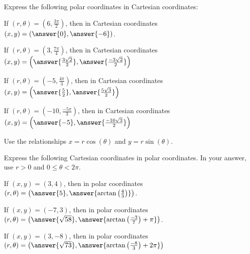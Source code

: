 \documentclass{ximera}
\author{Jason Miller}
\begin{document}
\begin{exercise}

Express the following polar coordinates in Cartesian coordinates: 

If $\left(r,\theta\right) = \left( 6, \frac{3\pi}{2}\right)$, then in Cartesian coordinates $(x,y) = \left( \answer{0}, \answer{-6 }\right)$.

If $\left(r,\theta\right) = \left(3, \frac{7 \pi}{4}\right)$, then in Cartesian coordinates $(x,y) = \left( \answer{\frac{3\sqrt{2}}{2}}, \answer{\frac{-3\sqrt{2}}{2}} \right)$

If $\left(r,\theta\right) =\left( -5, \frac{4\pi}{3} \right)$, then in Cartesian coordinates $(x,y) = \left( \answer{ \frac{5}{2}}, \answer{\frac{5\sqrt{3}}{2}} \right)$

If $\left(r,\theta\right) =\left( -10, \frac{-5\pi}{3} \right)$, then in Cartesian coordinates $(x,y) = \left( \answer{ -5 },  \answer{ \frac{-10 \sqrt{3}}{2} }     \right)$

\begin{hint}
Use the relationships $x=r\cos(\theta)$ and $y=r\sin(\theta)$.
\end{hint}

\end{exercise}

\begin{exercise}

Express the following Cartesian coordinates in polar coordinates.  In your answer, use $r>0$ and $0 \leq \theta < 2\pi$. 


If $(x,y) =\left( 3, 4 \right)$, then in polar coordinates $(r,\theta) =\left( \answer{ 5}, \answer{  \arctan\left( \frac{4}{3}\right) } \right) $. 

If $(x,y) =\left(-7, 3 \right)$, then in polar coordinates $(r,\theta) =\left( \answer{ \sqrt{58} } , \answer{  \arctan\left( \frac{-3}{7} \right) + \pi    } \right)$. 

If $(x,y) =\left(  3  ,  -8   \right)$, then in polar coordinates $(r,\theta) =\left (  \answer{ \sqrt{73}  }, \answer{\arctan\left( \frac{-8}{3}\right) + 2\pi } \right)$




\end{exercise}
\end{document}
